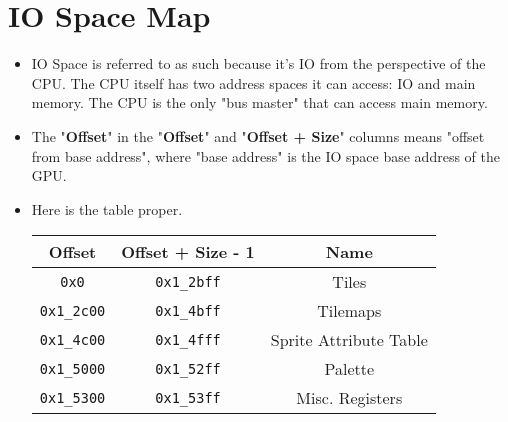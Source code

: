 \documentclass{article}
\begin{document}
\section{IO Space Map}
	\begin{itemize}
	\item IO Space is referred to as such because it's IO from the
	perspective of the CPU.  The CPU itself has two address spaces it can
	access:  IO and main memory.  The CPU is the only "bus master" that can
	access main memory.

	\item The "\textbf{Offset}" in the "\textbf{Offset}" and 
	"\textbf{Offset + Size}" columns means "offset from base address",
	where "base address" is the IO space base address of the GPU.

	\item Here is the table proper.
		\begin{table}[H]
			\begin{center}
				\begin{tabular}{|c|c|c|}
					\hline
					\textbf{Offset} & \textbf{Offset + Size - 1}
						& \textbf{Name}\\
					\hline
					\texttt{0x0} & \texttt{0x1\_2bff} & Tiles\\
					\texttt{0x1\_2c00} & \texttt{0x1\_4bff} & Tilemaps\\
					\texttt{0x1\_4c00} & \texttt{0x1\_4fff}
						& Sprite Attribute Table\\
					\texttt{0x1\_5000} & \texttt{0x1\_52ff}
						& Palette\\
					\texttt{0x1\_5300} & \texttt{0x1\_53ff}
						& Misc. Registers\\
					\hline
				\end{tabular}
			\end{center}
		\end{table}
	\end{itemize}
	\newpage


\end{document}
